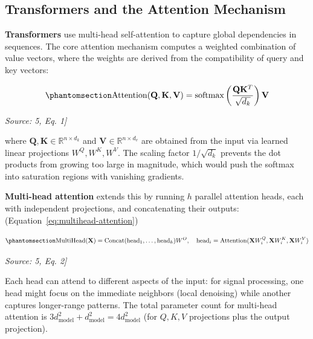 \subsection{Transformers and the Attention Mechanism}\label{sec:transformers-and-the-attention-mechanism}

\textbf{Transformers} \cite{Goodfellow2014GAN} use multi-head self-attention to capture global dependencies in sequences. The core attention mechanism computes a weighted combination of value vectors, where the weights are derived from the compatibility of query and key vectors:

\begin{equation}\protect\phantomsection\label{eq:attention}{\text{Attention}(\mathbf{Q}, \mathbf{K}, \mathbf{V}) = \text{softmax}\left(\frac{\mathbf{Q}\mathbf{K}^T}{\sqrt{d_k}}\right)\mathbf{V}
}\end{equation} \par{\small\textit{Source: \cite{Laneman2004CooperativeDiversity}5, Eq. 1]}}

where \(\mathbf{Q}, \mathbf{K} \in \mathbb{R}^{n \times d_k}\) and \(\mathbf{V} \in \mathbb{R}^{n \times d_v}\) are obtained from the input via learned linear projections \(W^Q, W^K, W^V\). The scaling factor \(1/\sqrt{d_k}\) prevents the dot products from growing too large in magnitude, which would push the softmax into saturation regions with vanishing gradients.

\textbf{Multi-head attention} extends this by running \(h\) parallel attention heads, each with independent projections, and concatenating their outputs: (Equation~\ref{eq:multihead-attention})

\begin{equation}\protect\phantomsection\label{eq:multihead-attention}{\text{MultiHead}(\mathbf{X}) = \text{Concat}(\text{head}_1, \dots, \text{head}_h) W^O, \quad \text{head}_i = \text{Attention}(\mathbf{X} W_i^Q, \mathbf{X} W_i^K, \mathbf{X} W_i^V)
}\end{equation} \par{\small\textit{Source: \cite{Laneman2004CooperativeDiversity}5, Eq. 2]}}

Each head can attend to different aspects of the input: for signal processing, one head might focus on the immediate neighbors (local denoising) while another captures longer-range patterns. The total parameter count for multi-head attention is \(3 d_{\text{model}}^2 + d_{\text{model}}^2 = 4 d_{\text{model}}^2\) (for \(Q, K, V\) projections plus the output projection).

